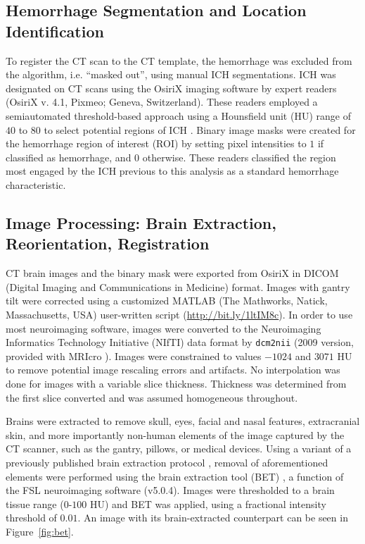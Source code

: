 \documentclass[10pt]{article}\usepackage[]{graphicx}\usepackage[]{color}
\begin{document}
\subsection*{Hemorrhage Segmentation and Location Identification}
To register the CT scan to the CT template, the hemorrhage was excluded from the algorithm, i.e. ``masked out'', using manual ICH segmentations.  ICH was designated on CT scans using the OsiriX imaging software by expert readers (OsiriX v. 4.1, Pixmeo; Geneva, Switzerland).  These readers employed a semiautomated threshold-based approach using a Hounsfield unit (HU) range of $40$ to $80$ to select potential regions of ICH \citep{bergstrom_variation_1977, smith_imaging_2006}.  Binary image masks were created for the hemorrhage region of interest (ROI) by setting pixel intensities to $1$ if classified as hemorrhage, and $0$ otherwise.  These readers classified the region most engaged by the ICH previous to this analysis as a standard hemorrhage characteristic.

\subsection*{Image Processing: Brain Extraction, Reorientation, Registration}
CT brain images and the binary mask were exported from OsiriX  in DICOM (Digital Imaging and Communications in Medicine) format.  Images with gantry tilt were corrected using a customized MATLAB (The Mathworks, Natick, Massachusetts, USA) user-written script ({\scriptsize \url{http://bit.ly/1ltIM8c}}). 
In order to use most neuroimaging software, images were converted to the Neuroimaging Informatics Technology Initiative (NIfTI) data format by \verb|dcm2nii| (2009 version, provided with MRIcro \citep{rorden_stereotaxic_2000}).  Images were constrained to values $-1024$ and $3071$ HU to remove potential image rescaling errors and artifacts.  No interpolation was done for images with a variable slice thickness. Thickness was determined from the first slice converted and was assumed homogeneous throughout.  

Brains were extracted to remove skull, eyes, facial and nasal features, extracranial skin, and more importantly non-human elements of the image captured by the CT scanner, such as the gantry, pillows, or medical devices.  Using a variant of a previously published brain extraction protocol \citep{rorden_age-specific_2012}, removal of aforementioned elements were performed using the brain extraction tool (BET) \citep{smith_fast_2002}, a function of the FSL \citep{jenkinson_fsl_2012} neuroimaging software (v5.0.4).  Images were thresholded to a brain tissue range ($0$-$100$ HU) and BET was applied, using a fractional intensity threshold of $0.01$.  An image with its brain-extracted counterpart can be seen in Figure~\ref{fig:bet}.  
\end{document}

